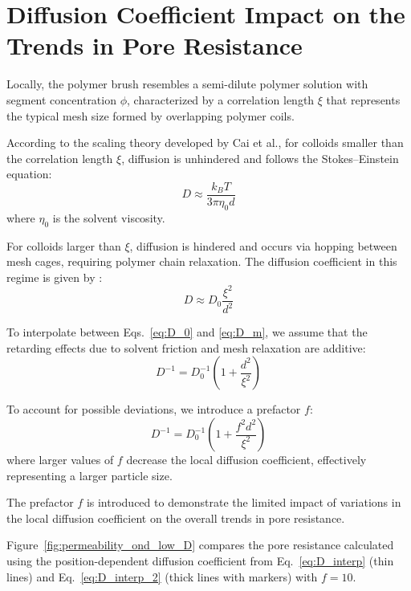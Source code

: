 \documentclass[10pt, a4paper]{article}
\begin{document}
\section{Diffusion Coefficient Impact on the Trends in Pore Resistance}
\begin{multicols}{2}
    
Locally, the polymer brush resembles a semi-dilute polymer solution with segment concentration $\phi$, characterized by a correlation length $\xi$ that represents the typical mesh size formed by overlapping polymer coils.

According to the scaling theory developed by Cai et al.\cite{Cai2011}, for colloids smaller than the correlation length $\xi$, diffusion is unhindered and follows the Stokes--Einstein equation:
\begin{equation}
D \approx \frac{k_B T}{3 \pi \eta_0 d}
\label{eq:D_0}
\end{equation}
where $\eta_0$ is the solvent viscosity.

For colloids larger than $\xi$, diffusion is hindered and occurs via hopping between mesh cages, requiring polymer chain relaxation. The diffusion coefficient in this regime is given by \cite{Cai2011}:
\begin{equation}
D \approx D_0 \frac{\xi^2}{d^2}
\label{eq:D_m}
\end{equation}

To interpolate between Eqs.~\ref{eq:D_0} and \ref{eq:D_m}, we assume that the retarding effects due to solvent friction and mesh relaxation are additive:
\begin{equation}
D^{-1} = D_0^{-1} \left( 1 + \frac{d^2}{\xi^2} \right)
\label{eq:D_interp}
\end{equation}

To account for possible deviations, we introduce a prefactor $f$:
\begin{equation}
D^{-1} = D_0^{-1} \left( 1 + \frac{f^2 d^2}{\xi^2} \right)
\label{eq:D_interp_2}
\end{equation}
where larger values of $f$ decrease the local diffusion coefficient, effectively representing a larger particle size.

The prefactor $f$ is introduced to demonstrate the limited impact of variations in the local diffusion coefficient on the overall trends in pore resistance.

Figure~\ref{fig:permeability_ond_low_D} compares the pore resistance calculated using the position-dependent diffusion coefficient from Eq.~\ref{eq:D_interp} (thin lines) and Eq.~\ref{eq:D_interp_2} (thick lines with markers) with $f = 10$.


\end{multicols}
\end{document}
